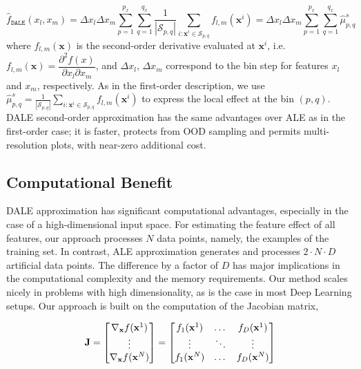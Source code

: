 \documentclass[wcp]{jmlr}
\newcommand{\dale}{\hat{f}_{\mathtt{DALE}}}
\newcommand{\xb}{\mathbf{x}} \newcommand{\R}{\mathbb{R}}
\begin{document}
\begin{equation}
  \dale(x_l, x_m)
  = \Delta x_l \Delta x_m \sum_{p=1}^{p_x} \sum_{q=1}^{q_x}
  \frac{1}{|\mathcal{S}_{p,q}|} \sum_{i:\xb^i \in \mathcal{S}_{p,q}}f_{l,m}(\xb^i)
  = \Delta x_l \Delta x_m \sum_{p=1}^{p_x} \sum_{q=1}^{q_x} \hat{\mu}_{p,q}^s
  \label{eq:DALE-2}
\end{equation}
%
where \( f_{l,m}(\xb) \) is the second-order derivative evaluated at
\(\xb^i\), i.e.
\( f_{l,m}(\xb) = \dfrac{\partial^2f(x)}{\partial x_l \partial x_m}
\), and \(\Delta x_l\), \(\Delta x_m\) correspond to the bin step for
features \(x_l\) and \(x_m\), respectively. As in the first-order
description, we use
\( \hat{\mu}_{p,q}^s = \frac{1}{|\mathcal{S}_{p,q}|} \sum_{i:\xb^i \in
  \mathcal{S}_{p,q}}f_{l,m}(\xb^i)\) to express the local effect at
the bin \( (p, q) \). DALE second-order approximation has the same
advantages over ALE as in the first-order case; it is faster, protects
from OOD sampling and permits multi-resolution plots, with near-zero
additional cost.

\subsection{Computational Benefit}
\label{sec:4-2-computational}

DALE approximation has significant computational advantages,
especially in the case of a high-dimensional input space. For
estimating the feature effect of all features, our approach processes
\(N\) data points, namely, the examples of the training set. In
contrast, ALE approximation generates and processes
\(2 \cdot N \cdot D\) artificial data points. The difference by a
factor of \(D\) has major implications in the computational complexity
and the memory requirements. Our method scales nicely in problems with
high dimensionality, as is the case in most Deep Learning setups. Our
approach is built on the computation of the Jacobian matrix,

\begin{equation} \Jac =
  \begin{bmatrix} \nabla_{\xb}f(\xb^1) \\ \vdots \\ \nabla_{\xb}f(\xb^N)
  \end{bmatrix} =
  \begin{bmatrix} f_1(\xb^1) & \dots & f_D(\xb^1)\\ \vdots & \ddots & \vdots \\ f_1(\xb^N) & \dots & f_D(\xb^N)
  \end{bmatrix}
\label{eq:jacobian}
\end{equation}
\end{document}
